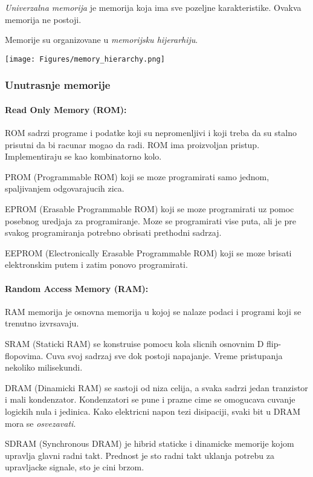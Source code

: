 \documentclass[12p,a4paper]{article}
\begin{document}
\begin{multicols}{2}
    \emph{Univerzalna memorija} je memorija koja ima sve pozeljne
    karakteristike. Ovakva memorija ne postoji.

    Memorije su organizovane u \emph{memorijsku hijerarhiju}.

    \texttt{[image: Figures/memory\_hierarchy.png]}
    
    \subsubsection{Unutrasnje memorije}
    
    \paragraph{Read Only Memory (ROM):}
    ROM sadrzi programe i podatke koji su nepromenljivi i koji treba da su
    stalno prisutni da bi racunar mogao da radi. ROM ima proizvoljan pristup.
    Implementiraju se kao kombinatorno kolo.
    
    PROM (Programmable ROM) koji se moze programirati samo jednom, spaljivanjem
    odgovarajucih zica.

    EPROM (Erasable Programmable ROM) koji se moze programirati uz pomoc
    posebnog uredjaja za programiranje. Moze se programirati vise puta,
    ali je pre svakog programiranja potrebno obrisati prethodni sadrzaj.

    EEPROM (Electronically Erasable Programmable ROM) koji se moze brisati
    elektronskim putem i zatim ponovo programirati.

    \paragraph{Random Access Memory (RAM):}
    RAM memorija je osnovna memorija u kojoj se nalaze podaci i programi
    koji se trenutno izvrsavaju.

    SRAM (Staticki RAM) se konstruise pomocu kola slicnih osnovnim D 
    flip-flopovima. Cuva svoj sadrzaj sve dok postoji napajanje. 
    Vreme pristupanja nekoliko milisekundi.

    DRAM (Dinamicki RAM) se sastoji od niza celija, a svaka sadrzi jedan
    tranzistor i mali kondenzator. Kondenzatori se pune i prazne cime se 
    omogucava cuvanje logickih nula i jedinica. Kako elektricni napon
    tezi disipaciji, svaki bit u DRAM mora se \emph{osvezavati}. 

    SDRAM (Synchronous DRAM) je hibrid staticke i dinamicke memorije kojom
    upravlja glavni radni takt. Prednost je sto radni takt uklanja potrebu za
    upravljacke signale, sto je cini brzom.
    

\end{multicols}
\end{document}
